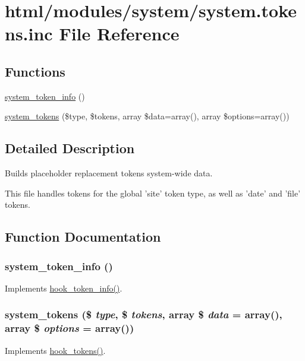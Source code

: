 \hypertarget{system_8tokens_8inc}{
\section{html/modules/system/system.tokens.inc File Reference}
\label{system_8tokens_8inc}
}
\subsection*{Functions}
\begin{DoxyCompactItemize}
\item 
\hyperlink{system_8tokens_8inc_a10be41629ca441518c9c34a8127a77b4}{system\_\-token\_\-info} ()
\item 
\hyperlink{system_8tokens_8inc_a6f7ae7a1f93a4ab086e5492b865f3fff}{system\_\-tokens} (\$type, \$tokens, array \$data=array(), array \$options=array())
\end{DoxyCompactItemize}


\subsection{Detailed Description}
Builds placeholder replacement tokens system-\/wide data.

This file handles tokens for the global 'site' token type, as well as 'date' and 'file' tokens. 

\subsection{Function Documentation}
\hypertarget{system_8tokens_8inc_a10be41629ca441518c9c34a8127a77b4}{
\subsubsection[{system\_\-token\_\-info}]{\setlength{\rightskip}{0pt plus 5cm}system\_\-token\_\-info ()}}
\label{system_8tokens_8inc_a10be41629ca441518c9c34a8127a77b4}
Implements \hyperlink{group__hooks_gab868597197cf36911f95dcd29ae0b954}{hook\_\-token\_\-info()}. \hypertarget{system_8tokens_8inc_a6f7ae7a1f93a4ab086e5492b865f3fff}{
\subsubsection[{system\_\-tokens}]{\setlength{\rightskip}{0pt plus 5cm}system\_\-tokens (\$ {\em type}, \/  \$ {\em tokens}, \/  array \$ {\em data} = {\ttfamily array()}, \/  array \$ {\em options} = {\ttfamily array()})}}
\label{system_8tokens_8inc_a6f7ae7a1f93a4ab086e5492b865f3fff}
Implements \hyperlink{group__hooks_ga3bfd87d9a19b2397b0f970e1cff7ea4f}{hook\_\-tokens()}. 